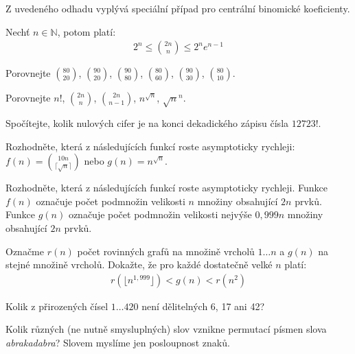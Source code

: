 Z uvedeného odhadu vyplývá speciální případ pro centrální binomické koeficienty.
\begin{t_corollary}
  Nechť $n\in\mathbb{N}$, potom platí:
  \begin{align*}
    2^n\leq \binom{2n}{n}\leq 2^ne^{n-1}
  \end{align*}
\end{t_corollary}

\begin{t_exercise}
  \item Porovnejte $\binom{80}{20}$, $\binom{90}{20}$, $\binom{90}{80}$, $\binom{80}{60}$, $\binom{90}{30}$, $\binom{80}{10}$.
  \item Porovnejte $n!$, $\binom{2n}{n}$, $\binom{2n}{n-1}$, $n^{\sqrt{n}}$, $\sqrt{n}^n$.
  \item Spočítejte, kolik nulových cifer je na konci dekadického zápisu čísla $12723!$.
  \item Rozhodněte, která z následujících funkcí roste asymptoticky rychleji:
  \\$f(n)=\binom{10n}{\lceil\sqrt{n}\rceil}$ nebo $g(n)=n^\sqrt{n}$.
  \item Rozhodněte, která z následujících funkcí roste asymptoticky rychleji. Funkce $f(n)$ označuje počet podmnožin velikosti $n$ množiny obsahující $2n$ prvků. Funkce $g(n)$ označuje počet podmnožin velikosti nejvýše $0,999n$ množiny obsahující $2n$ prvků.
  \item Označme $r(n)$ počet rovinných grafů na množině vrcholů $1\dots n$ a $g(n)$ na stejné množině vrcholů. Dokažte, že pro každé dostatečně velké $n$ platí:
  \begin{align*}
    r(\lfloor n^{1,999} \rfloor)<g(n)<r(n^2)
  \end{align*}
  \item Kolik z přirozených čísel $1\dots 420$ není dělitelných 6, 17 ani 42?
  \item Kolik různých (ne nutně smysluplných) slov vznikne permutací písmen slova \textit{abrakadabra}? Slovem myslíme jen posloupnost znaků.
\end{t_exercise}
